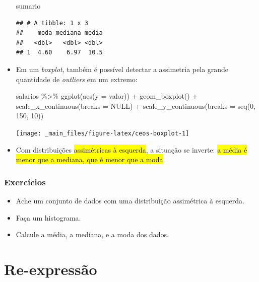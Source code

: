 \documentclass[
  11pt]{report}
\newenvironment{Shaded}{\begin{snugshade}}{\end{snugshade}}
\newcommand{\AttributeTok}[1]{\textcolor[rgb]{0.77,0.63,0.00}{#1}}
\newcommand{\ConstantTok}[1]{\textcolor[rgb]{0.00,0.00,0.00}{#1}}
\newcommand{\DecValTok}[1]{\textcolor[rgb]{0.00,0.00,0.81}{#1}}
\newcommand{\FunctionTok}[1]{\textcolor[rgb]{0.00,0.00,0.00}{#1}}
\newcommand{\NormalTok}[1]{#1}
\newcommand{\SpecialCharTok}[1]{\textcolor[rgb]{0.00,0.00,0.00}{#1}}
\renewenvironment{Shaded}{
    \begin{mdframed}[%
      roundcorner=2pt,%
      innerleftmargin=5pt,%
      innerrightmargin=5pt,%
      topline=true,%
      leftline=true,%
      rightline=true,%
      bottomline=true,%
      linewidth=0.5pt,%
      linecolor=black!20,%
      backgroundcolor=black!2,%
      skipabove=2ex,%
      skipbelow=2.5ex%
    ]%
  }
  {
    \end{mdframed}
  }
\begin{document}
\begin{itemize}
\begin{Shaded}
\begin{Highlighting}[]
\NormalTok{sumario}
\end{Highlighting}
\end{Shaded}

\begin{verbatim}
## # A tibble: 1 x 3
##    moda mediana media
##   <dbl>   <dbl> <dbl>
## 1  4.60    6.97  10.5
\end{verbatim}
\item
  Em um \emph{boxplot}, também é possível detectar a assimetria pela grande quantidade de \emph{outliers} em um extremo:

\begin{Shaded}
\begin{Highlighting}[]
\NormalTok{salarios }\SpecialCharTok{\%\textgreater{}\%} 
  \FunctionTok{ggplot}\NormalTok{(}\FunctionTok{aes}\NormalTok{(}\AttributeTok{y =}\NormalTok{ valor)) }\SpecialCharTok{+}
    \FunctionTok{geom\_boxplot}\NormalTok{() }\SpecialCharTok{+}
    \FunctionTok{scale\_x\_continuous}\NormalTok{(}\AttributeTok{breaks =} \ConstantTok{NULL}\NormalTok{) }\SpecialCharTok{+}
    \FunctionTok{scale\_y\_continuous}\NormalTok{(}\AttributeTok{breaks =} \FunctionTok{seq}\NormalTok{(}\DecValTok{0}\NormalTok{, }\DecValTok{150}\NormalTok{, }\DecValTok{10}\NormalTok{))}
\end{Highlighting}
\end{Shaded}

  \begin{center}\texttt{[image: \_main\_files/figure-latex/ceos-boxplot-1]} \end{center}
\item
  Com distribuições {\hl{assimétricas à esquerda}}, a situação se inverte: {\hl{a média é menor que a mediana, que é menor que a moda}}.
\end{itemize}

\hypertarget{exercuxedcios-6}{%
\subsubsection{Exercícios}\label{exercuxedcios-6}}

\begin{itemize}
\item
  Ache um conjunto de dados com uma distribuição assimétrica à esquerda.
\item
  Faça um histograma.
\item
  Calcule a média, a mediana, e a moda dos dados.
\end{itemize}

\hypertarget{re-expressuxe3o}{%
\section{Re-expressão}\label{re-expressuxe3o}}
\end{document}

